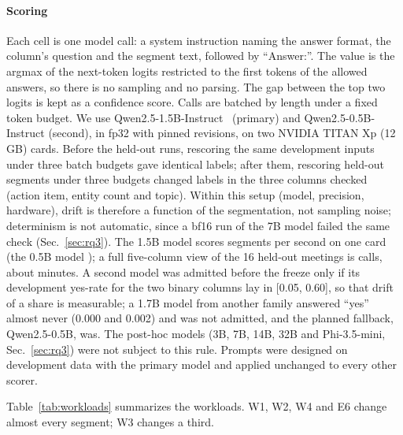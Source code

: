 \documentclass[conference]{IEEEtran}
\begin{document}
\paragraph*{Scoring} Each cell is one model call: a system instruction naming the answer format, the column's
question and the segment text, followed by ``Answer:''. The value is the argmax of the next-token logits restricted
to the first tokens of the allowed answers, so there is no sampling and no parsing. The gap between the top two
logits is kept as a confidence score. Calls are batched by length under a fixed token budget. We use
Qwen2.5-1.5B-Instruct~\cite{qwen25} (primary) and Qwen2.5-0.5B-Instruct (second), in fp32 with pinned revisions, on
two NVIDIA TITAN Xp (12\,GB) cards. Before the held-out runs, rescoring the same development inputs under three batch
budgets gave identical labels; after them, rescoring \nDetN{} held-out segments under three budgets changed
\nDetMism{} labels in the three columns checked (action item, entity count and topic). Within this setup (model, precision, hardware),
drift is therefore a function of the segmentation, not sampling noise; determinism is not automatic, since a bf16 run
of the 7B model failed the same check (Sec.~\ref{sec:rq3}). The 1.5B model scores \nThrBig{} segments per second on
one card (the 0.5B model \nThrSmall); a full five-column view of the 16 held-out meetings is \nFullCalls{} calls,
about \nFullMin{} minutes. A second model was admitted before the freeze only if its development yes-rate for the
two binary columns lay in [0.05, 0.60], so that drift of a share is measurable; a 1.7B model from another family
answered ``yes'' almost never (0.000 and 0.002) and was not admitted, and the planned fallback, Qwen2.5-0.5B, was. The
post-hoc models (3B, 7B, 14B, 32B and Phi-3.5-mini, Sec.~\ref{sec:rq3}) were not subject to this rule. Prompts were
designed on development data with the primary model and applied unchanged to every other scorer.
\begin{table}[t]
\centering\footnotesize
\caption{Workloads on held-out data: units, mean segments per unit (old, new), share of new segments that
changed (not matched one-to-one by an old segment of the same speaker with the same text and both boundary times
within 50\,ms), and units whose primary-query answer on the old side passes the 0.02 guard. A changed segment can still
have the same text as an old one, when only its times moved; content hashing reuses those.}
\label{tab:workloads}
\setlength{\tabcolsep}{4pt}

\end{table}
Table~\ref{tab:workloads} summarizes the workloads. W1, W2, W4 and E6 change almost every segment; W3 changes a third.
\end{document}
